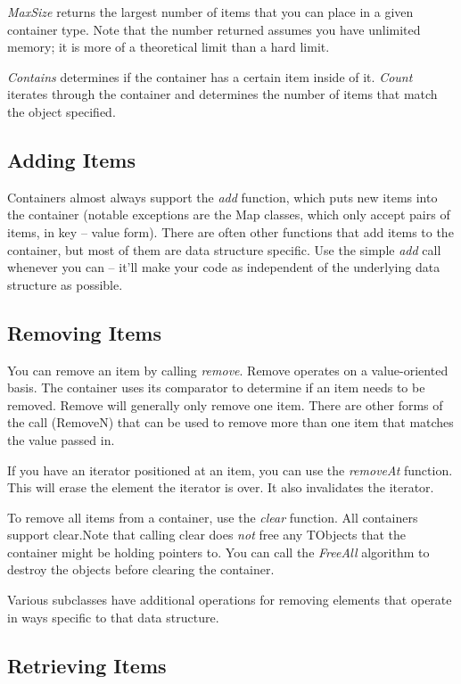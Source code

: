 \documentclass{report}
\begin{document}
\emph{MaxSize} returns the largest number of items that you can place 
in a given container type. Note that the number returned assumes you have
unlimited memory; it is more of a theoretical limit than a hard limit.

\emph{Contains} determines if the container has a certain item inside of it.
\emph{Count} iterates through the container and determines the number of
items that match the object specified.

\subsection{Adding Items}

Containers almost always support the \emph{add} function, which puts new
items into the container (notable exceptions are the Map classes, which only
accept pairs of items, in key -- value form). There are often other
functions that add items to the container, but most of them are data
structure specific. Use the simple \emph{add} call whenever you can -- it'll
make your code as independent of the underlying data structure as possible.

\subsection{Removing Items}

You can remove an item by calling \emph{remove}. Remove operates on a
value-oriented basis. The container uses its comparator to determine if an
item needs to be removed. Remove will generally only remove one item. There
are other forms of the call (RemoveN) that can be used to remove more than
one item that matches the value passed in.

If you have an iterator positioned at an item, you can use the
\emph{removeAt} function. This will erase the element the iterator is over.
It also invalidates the iterator.

To remove all items from a container, use the \emph{clear} function. All
containers support clear.Note that calling clear does \emph{not} free any
TObjects that the container might be holding pointers to. You can call the
\emph{FreeAll} algorithm to destroy the objects before clearing the container.

Various subclasses have additional operations for removing elements 
that operate in ways specific to that data structure.

\subsection{Retrieving Items}
\end{document}

